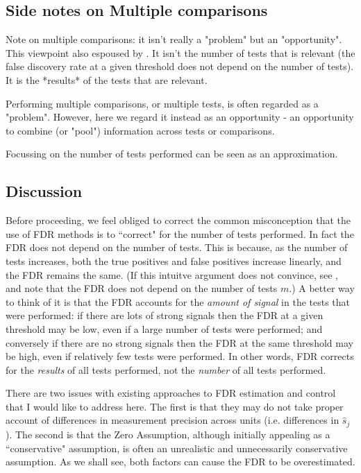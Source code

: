 \documentclass[11pt]{article}
\def\shat{\hat{s}}
\begin{document}
\subsection{Side notes on Multiple comparisons}

Note on multiple comparisons: it isn't really a "problem" but an "opportunity". This viewpoint also espoused by \cite{greenland1991empirical}. It isn't the number of tests that is relevant (the false
discovery rate at a given threshold does not depend on the number of tests). It is the *results* of the tests that are relevant.

Performing multiple comparisons, or multiple tests, is often
regarded as a "problem". However, here we regard it instead as an opportunity - an opportunity to combine (or "pool") information across tests or comparisons.

Focussing on the number of tests performed can be
seen as an approximation. 


\subsection{Discussion}

Before proceeding, we feel obliged to correct the common misconception
 that the use of FDR methods is to ``correct" for the number of tests performed. In fact the FDR does
 not depend on the number of tests. This is because, as the number of tests increases, both the true positives and false positives increase linearly,
 and the FDR remains the same. (If this intuitve argument does not convince, see \cite{storey.xx}, and note that the FDR does not depend on the number of tests $m$.)
  A better way to think of it is that the FDR accounts for the {\it amount of signal} in the tests that were performed: 
 if there are lots of strong signals then the FDR at a given threshold may be low, even if a large number of tests were performed; and conversely
 if there are no strong signals then the FDR at the same threshold may be high, even if relatively few tests were performed. 
 In other words, FDR corrects for the {\it results} of all tests performed, not the {\it number} of all tests performed.
 

 There are two issues with existing approaches to FDR estimation and control that I would like to address here. 
 The first is that they may do not take proper account of differences in measurement precision across units (i.e. differences in $\shat_j$). 
 The second is that the Zero Assumption, although initially appealing as a ``conservative" assumption,
  is often an unrealistic and unnecessarily conservative assumption. As we shall see, both factors can cause the FDR to be overestimated.
 
\end{document}
